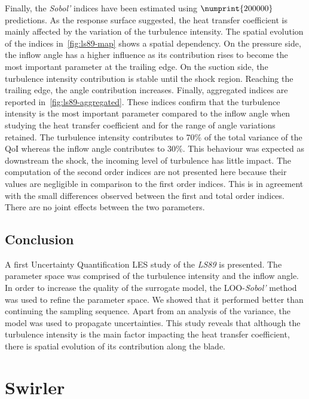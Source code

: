 Finally, the \textit{Sobol'} indices have been estimated using $\numprint{200000}$ predictions. As the response surface suggested, the heat transfer coefficient is mainly affected by the variation of the turbulence intensity. The spatial evolution of the indices in~\cref{fig:ls89-map} shows a spatial dependency. On the pressure side, the inflow angle has a higher influence as its contribution rises to become the most important parameter at the trailing edge. On the suction side, the turbulence intensity contribution is stable until the shock region. Reaching the trailing edge, the angle contribution increases. Finally, aggregated indices are reported in~\cref{fig:ls89-aggregated}. These indices confirm that the turbulence intensity is the most important parameter compared to the inflow angle when studying the heat transfer coefficient and for the range of angle variations retained. The turbulence intensity contributes to 70\% of the total variance of the QoI whereas the inflow angle contributes to 30\%. This behaviour was expected as downstream the shock, the incoming level of turbulence has little impact. The computation of the second order indices are not presented here because their values are negligible in comparison to the first order indices. This is in agreement with the small differences observed between the first and total order indices. There are no joint effects between the two parameters.


\section{Conclusion}

A first Uncertainty Quantification LES study of the \textit{LS89} is presented. The parameter space was comprised of the turbulence intensity and the inflow angle. In order to increase the quality of the surrogate model, the LOO-\textit{Sobol'} method was used to refine the parameter space. We showed that it performed better than continuing the sampling sequence. Apart from an analysis of the variance, the model was used to propagate uncertainties. This study reveals that although the turbulence intensity is the main factor impacting the heat transfer coefficient, there is spatial evolution of its contribution along the blade.


\chapter{Swirler}

\newcommand{\pdv}[2]{\frac{\partial{#1}}{\partial{#2}}}
\newcommand{\tilda}[1]{\tilde{#1}}


